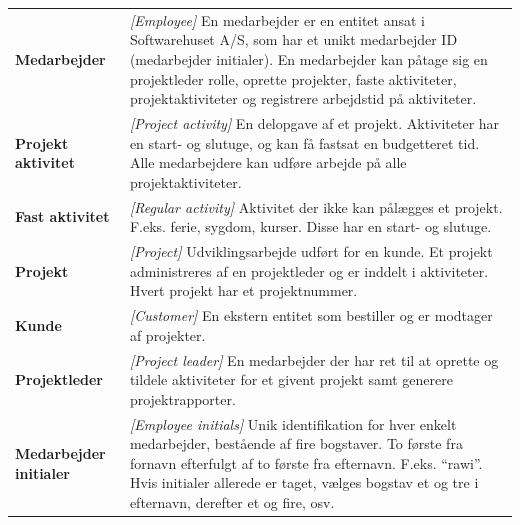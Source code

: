 \begin{table}[H]
    \centering
    \setlength{\extrarowheight}{8pt}
    \begin{tabular}{>{\bfseries}l p{}}
        Medarbejder             & \textit{[Employee]} En medarbejder er en entitet ansat i Softwarehuset A/S, som har et unikt medarbejder ID (medarbejder initialer). En medarbejder kan påtage sig en projektleder rolle, oprette projekter, faste aktiviteter, projektaktiviteter og registrere arbejdstid på aktiviteter.                                    \\
        Projekt aktivitet       & \textit{[Project activity]} En delopgave af et projekt. Aktiviteter har en start- og slutuge, og kan få fastsat en budgetteret tid. Alle medarbejdere kan udføre arbejde på alle projektaktiviteter.                                                                                                                           \\
        Fast aktivitet          & \textit{[Regular activity]} Aktivitet der ikke kan pålægges et projekt. F.eks. ferie, sygdom, kurser. Disse har en start- og slutuge.                                                                                                                                                                                          \\
        Projekt                 & \textit{[Project]} Udviklingsarbejde udført for en kunde. Et projekt administreres af en projektleder og er inddelt i aktiviteter. Hvert projekt har et projektnummer.                                                                                                                                                         \\
        Kunde                   & \textit{[Customer]} En ekstern entitet som bestiller og er modtager af projekter.                                                                                                                                                                                                                                              \\
        Projektleder            & \textit{[Project leader]} En medarbejder der har ret til at oprette og tildele aktiviteter for et givent projekt samt generere projektrapporter.                                                                                                                                                                               \\
        Medarbejder initialer   & \textit{[Employee initials]} Unik identifikation for hver enkelt medarbejder, bestående af fire bogstaver. To første fra fornavn efterfulgt af to første fra efternavn. F.eks. ``rawi''. Hvis initialer allerede er taget, vælges bogstav et og tre i efternavn, derefter et og fire, osv.                                     \\

\end{tabular}
\end{table}
